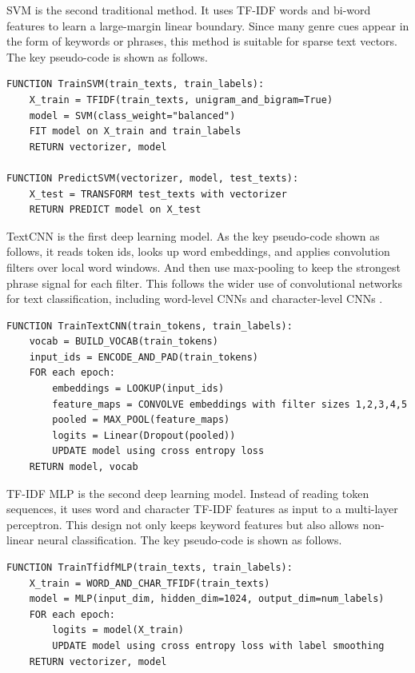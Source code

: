 \documentclass[12pt,a4paper]{article}
\begin{document}
SVM is the second traditional method. It uses TF-IDF words and bi-word features to learn a large-margin linear boundary. Since many genre cues appear in the form of keywords or phrases, this method is suitable for sparse text vectors. The key pseudo-code is shown as follows.

\begin{lstlisting}[style=pseudocode,caption={SVM with TF-IDF.}]
FUNCTION TrainSVM(train_texts, train_labels):
    X_train = TFIDF(train_texts, unigram_and_bigram=True)
    model = SVM(class_weight="balanced")
    FIT model on X_train and train_labels
    RETURN vectorizer, model

FUNCTION PredictSVM(vectorizer, model, test_texts):
    X_test = TRANSFORM test_texts with vectorizer
    RETURN PREDICT model on X_test
\end{lstlisting}

TextCNN is the first deep learning model. As the key pseudo-code shown as follows, it reads token ids, looks up word embeddings, and applies convolution filters over local word windows. And then use max-pooling to keep the strongest phrase signal for each filter. This follows the wider use of convolutional networks for text classification, including word-level CNNs and character-level CNNs \cite{kim2014cnn,zhang2015charcnn}.

\begin{lstlisting}[style=pseudocode,caption={TextCNN with word embeddings.}]
FUNCTION TrainTextCNN(train_tokens, train_labels):
    vocab = BUILD_VOCAB(train_tokens)
    input_ids = ENCODE_AND_PAD(train_tokens)
    FOR each epoch:
        embeddings = LOOKUP(input_ids)
        feature_maps = CONVOLVE embeddings with filter sizes 1,2,3,4,5
        pooled = MAX_POOL(feature_maps)
        logits = Linear(Dropout(pooled))
        UPDATE model using cross entropy loss
    RETURN model, vocab
\end{lstlisting}

TF-IDF MLP is the second deep learning model. Instead of reading token sequences, it uses word and character TF-IDF features as input to a multi-layer perceptron. This design not only keeps keyword features but also allows non-linear neural classification. The key pseudo-code is shown as follows.

\begin{lstlisting}[style=pseudocode,caption={TF-IDF MLP neural classifier.}]
FUNCTION TrainTfidfMLP(train_texts, train_labels):
    X_train = WORD_AND_CHAR_TFIDF(train_texts)
    model = MLP(input_dim, hidden_dim=1024, output_dim=num_labels)
    FOR each epoch:
        logits = model(X_train)
        UPDATE model using cross entropy loss with label smoothing
    RETURN vectorizer, model
\end{lstlisting}
\end{document}
